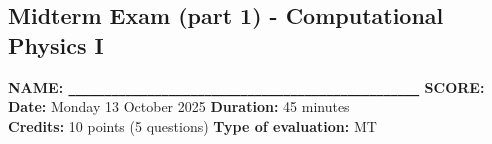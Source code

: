 \documentclass[12pt,a4paper]{article}
\date{\today}
\begin{document}
\thispagestyle{empty}

\newpage
\pagestyle{empty}

\begin{center}\section*{Midterm Exam (part 1) - Computational Physics I}\end{center}
\vspace{0.2cm}
{\bf NAME: \verb|_________________________________________________|  SCORE:} \\
{\bf Date:} Monday 13 October 2025 \hspace{0.25cm} {\bf Duration:} 45 minutes\\
  \hspace{0.25cm} {\bf Credits:} 10 points (5 questions) \hspace{0.25cm}  {\bf Type of evaluation:} MT\\

\vspace{-0.6cm}
\end{document}
